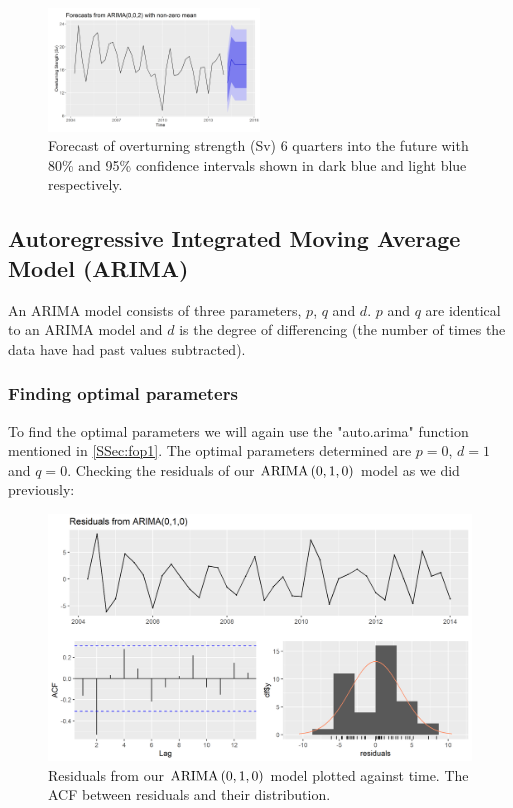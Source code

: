 \begin{figure}[H]
    \centering
    \includegraphics[width=0.50\textwidth]{Sections/ARIMA/Plots/forecast.png}
    \caption{Forecast of overturning strength (Sv) 6 quarters into the future with 80\% and 95\% confidence intervals shown in dark blue and light blue respectively.}
    \label{S2fig:ARMA forecast}
\end{figure}

\subsection{Autoregressive Integrated Moving Average Model (ARIMA)}

An ARIMA model consists of three parameters, $p$, $q$ and $d$. $p$ and $q$ are identical to an ARIMA model and $d$ is the degree of differencing (the number of times the data have had past values subtracted). 

\subsubsection{Finding optimal parameters}

To find the optimal parameters we will again use the "auto.arima" function mentioned in \autoref{SSec:fop1}.
\nline
The optimal parameters determined are $p=0$, $d=1$ and $q=0$. Checking the residuals of our $\text{ARIMA}\left(0,1,0\right)$ model as we did previously:

\begin{figure}[H]
    \centering
    \includegraphics[width=\sTwoRes\textwidth]{Sections/ARIMA/Plots/auto__arima_res.png}
    \caption{Residuals from our $\text{ARIMA}\left(0,1,0\right)$ model plotted against time. The ACF between residuals and their distribution.}
    \label{S2fig:arima_res}
\end{figure}

